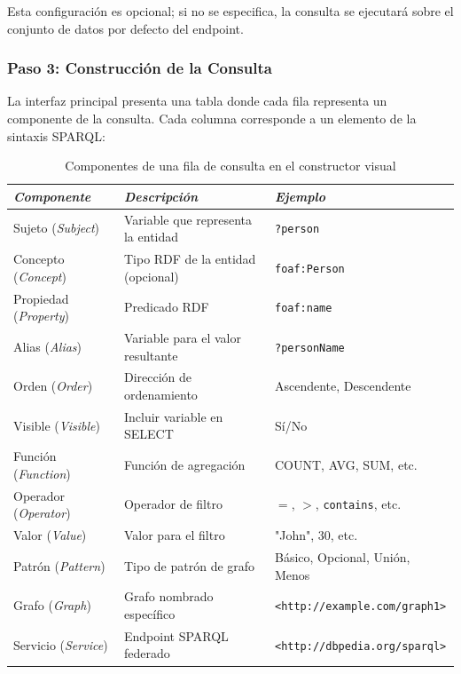 \documentclass{article}
\begin{document}
Esta configuración es opcional; si no se especifica, la consulta se ejecutará sobre el conjunto de datos por defecto del endpoint.

\subsubsection{Paso 3: Construcción de la Consulta}
\label{subsubsec:query-construction}

La interfaz principal presenta una tabla donde cada fila representa un componente de la consulta. Cada columna corresponde a un elemento de la sintaxis SPARQL:


\begin{table}
\centering
\caption{Componentes de una fila de consulta en el constructor visual}
\label{tab:query-row-components}
\begin{tabular}{|p{3cm}|p{4cm}|p{7cm}|}
\hline
\textit{Componente} & \textit{Descripción} & \textit{Ejemplo} \\
\hline
Sujeto (\textit{Subject}) & Variable que representa la entidad & \texttt{?person} \\
\hline
Concepto (\textit{Concept}) & Tipo RDF de la entidad (opcional) & \texttt{foaf:Person} \\
\hline
Propiedad (\textit{Property}) & Predicado RDF & \texttt{foaf:name} \\
\hline
Alias (\textit{Alias}) & Variable para el valor resultante & \texttt{?personName} \\
\hline
Orden (\textit{Order}) & Dirección de ordenamiento & Ascendente, Descendente \\
\hline
Visible (\textit{Visible}) & Incluir variable en SELECT & Sí/No \\
\hline
Función (\textit{Function}) & Función de agregación & COUNT, AVG, SUM, etc. \\
\hline
Operador (\textit{Operator}) & Operador de filtro & $=$, $>$, \texttt{contains}, etc. \\
\hline
Valor (\textit{Value}) & Valor para el filtro & "John", 30, etc. \\
\hline
Patrón (\textit{Pattern}) & Tipo de patrón de grafo & Básico, Opcional, Unión, Menos \\
\hline
Grafo (\textit{Graph}) & Grafo nombrado específico & \texttt{<http://example.com/graph1>} \\
\hline
Servicio (\textit{Service}) & Endpoint SPARQL federado & \texttt{<http://dbpedia.org/sparql>} \\
\hline
\end{tabular}
\end{table}
\end{document}
